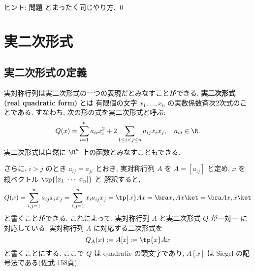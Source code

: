 \documentclass[12pt,twoside]{jarticle}
\begin{document}
\noindent
ヒント: 問題  とまったく同じやり方.
\qed


\section{実二次形式}
\label{sec:real-quadratic-form}


\subsection{実二次形式の定義}
\label{sec:def-real-q-form}

実対称行列は実二次形式の一つの表現だとみなすことができる.  
{\bf 実二次形式 (real quadratic form)} とは
有限個の文字 $x_1,\dots,x_n$ の実数係数斉次2次式のことである. すなわち,
次の形の式を実二次形式と呼ぶ:
\begin{equation*}
  Q(x) = \sum_{i=1}^n a_{ii} x_i^2 + 2 \sum_{1\le i<j\le n} a_{ij}x_ix_j,
  \quad
  a_{ij}\in\R.
\end{equation*}
実二次形式は自然に $\R^n$ 上の函数とみなすこともできる.

さらに, $i>j$ のとき $a_{ij}=a_{ji}$ とおき, 実対称行列 $A$ を %
$A = [a_{ij}]$ と定め, $x$ を縦ベクトル $\tp{[x_1\ \cdots\ x_n]}$ と
解釈すると,
\begin{equation*}
  Q(x) = \sum_{i,j=1}^n a_{ij} x_ix_j
  = \sum_{i,j=1}^n x_i a_{ij} x_j
  = \tp{x}Ax
  = \bra x,Ax\ket = \bra Ax,x\ket
\end{equation*}
と書くことができる.  これによって, 実対称行列 $A$ と実二次形式 $Q$ が一対一
に対応している.  実対称行列 $A$ に対応する二次形式を
\begin{equation*}
  Q_A(x) := A[x] := \tp{x}Ax
\end{equation*}
と書くことにする.  ここで $Q$ は quadratic の頭文字であり, 
$A[x]$ は Siegel の記号法である(佐武 \cite{satake} 158頁).

\medskip
\end{document}
